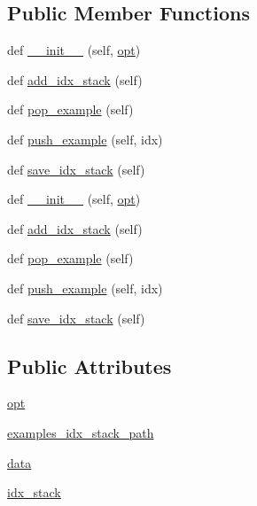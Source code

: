 \subsection*{Public Member Functions}
\begin{DoxyCompactItemize}
\item 
def \hyperlink{classstack__rank__evals_1_1worlds_1_1ExampleGenerator_a6b15b72b85a0358bb6c171ef6b183c9d}{\+\_\+\+\_\+init\+\_\+\+\_\+} (self, \hyperlink{classstack__rank__evals_1_1worlds_1_1ExampleGenerator_ace0d63240bf6384a7ba7552f813ce600}{opt})
\item 
def \hyperlink{classstack__rank__evals_1_1worlds_1_1ExampleGenerator_a9bc7f39d14003d695ad66b624607dc05}{add\+\_\+idx\+\_\+stack} (self)
\item 
def \hyperlink{classstack__rank__evals_1_1worlds_1_1ExampleGenerator_ae50d35087dd679c73aa8f5354845199f}{pop\+\_\+example} (self)
\item 
def \hyperlink{classstack__rank__evals_1_1worlds_1_1ExampleGenerator_a75b62011b063cb2879cca50917383d0e}{push\+\_\+example} (self, idx)
\item 
def \hyperlink{classstack__rank__evals_1_1worlds_1_1ExampleGenerator_a47a988958641b4906b2d374938974cca}{save\+\_\+idx\+\_\+stack} (self)
\item 
def \hyperlink{classstack__rank__evals_1_1worlds_1_1ExampleGenerator_a6b15b72b85a0358bb6c171ef6b183c9d}{\+\_\+\+\_\+init\+\_\+\+\_\+} (self, \hyperlink{classstack__rank__evals_1_1worlds_1_1ExampleGenerator_ace0d63240bf6384a7ba7552f813ce600}{opt})
\item 
def \hyperlink{classstack__rank__evals_1_1worlds_1_1ExampleGenerator_a9bc7f39d14003d695ad66b624607dc05}{add\+\_\+idx\+\_\+stack} (self)
\item 
def \hyperlink{classstack__rank__evals_1_1worlds_1_1ExampleGenerator_ae50d35087dd679c73aa8f5354845199f}{pop\+\_\+example} (self)
\item 
def \hyperlink{classstack__rank__evals_1_1worlds_1_1ExampleGenerator_a75b62011b063cb2879cca50917383d0e}{push\+\_\+example} (self, idx)
\item 
def \hyperlink{classstack__rank__evals_1_1worlds_1_1ExampleGenerator_a47a988958641b4906b2d374938974cca}{save\+\_\+idx\+\_\+stack} (self)
\end{DoxyCompactItemize}
\subsection*{Public Attributes}
\begin{DoxyCompactItemize}
\item 
\hyperlink{classstack__rank__evals_1_1worlds_1_1ExampleGenerator_ace0d63240bf6384a7ba7552f813ce600}{opt}
\item 
\hyperlink{classstack__rank__evals_1_1worlds_1_1ExampleGenerator_a7db0970c7854ce8924ee67bc27434795}{examples\+\_\+idx\+\_\+stack\+\_\+path}
\item 
\hyperlink{classstack__rank__evals_1_1worlds_1_1ExampleGenerator_a5a7c0e1dffc812f2e3c63c2762d247ae}{data}
\item 
\hyperlink{classstack__rank__evals_1_1worlds_1_1ExampleGenerator_a25ac01a7a0f457effd23aa7abdffd8c6}{idx\+\_\+stack}
\end{DoxyCompactItemize}


